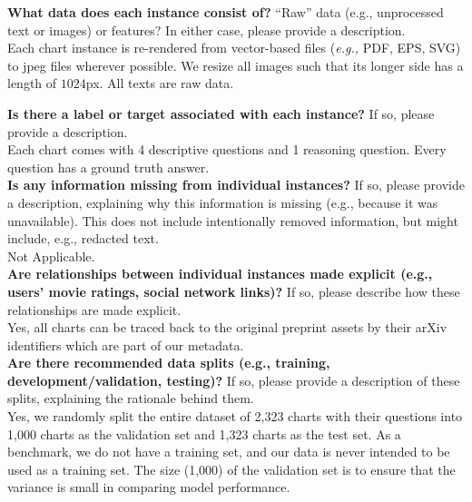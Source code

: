     \textcolor{\sectioncolor}{\textbf{What data does each instance consist of?
    }
    “Raw” data (e.g., unprocessed text or images) or features? In either case,
    please provide a description.
    } \\
    Each chart instance is re-rendered from vector-based files (\textit{e.g.,} PDF, EPS, SVG) to jpeg files wherever possible. We resize all images such that its longer side has a length of $1024$px. All texts are raw data.
    
    \textcolor{\sectioncolor}{\textbf{Is there a label or target associated with each instance?
    }
    If so, please provide a description.
    } \\
    Each chart comes with 4 descriptive questions and 1 reasoning question. Every question has a ground truth answer. \\
    
    \textcolor{\sectioncolor}{\textbf{Is any information missing from individual instances?
    }
    If so, please provide a description, explaining why this information is
    missing (e.g., because it was unavailable). This does not include
    intentionally removed information, but might include, e.g., redacted text.
    } \\
    Not Applicable. \\
    
    \textcolor{\sectioncolor}{\textbf{Are relationships between individual instances made explicit (e.g., users’
    movie ratings, social network links)?
    }
    If so, please describe how these relationships are made explicit.
    } \\
    Yes, all charts can be traced back to the original preprint assets by their arXiv identifiers which are part of our metadata. \\
    
    \textcolor{\sectioncolor}{\textbf{Are there recommended data splits (e.g., training, development/validation,
    testing)?
    }
    If so, please provide a description of these splits, explaining the
    rationale behind them.
    } \\
    Yes, we randomly split the entire dataset of 2,323 charts with their questions into 1,000 charts as the validation set and 1,323 charts as the test set. As a benchmark, we do not have a training set, and our data is never intended to be used as a training set. The size (1,000) of the validation set is to ensure that the variance is small in comparing model performance. \\
    
